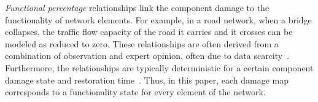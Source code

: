 \emph{Functional percentage} relationships link the component damage to the functionality of network elements.  For example, in a road network, when a bridge collapses, the traffic flow capacity of the road it carries and it crosses can be modeled as reduced to zero. These relationships are often derived from a combination of observation and expert opinion, often due to data scarcity~\cite{werner_redars_2006}. Furthermore, the relationships are typically deterministic for a certain component damage state and restoration time~\cite{werner_redars_2006}. Thus, in this paper, each damage map corresponds to a functionality state for every element of the network.
%


